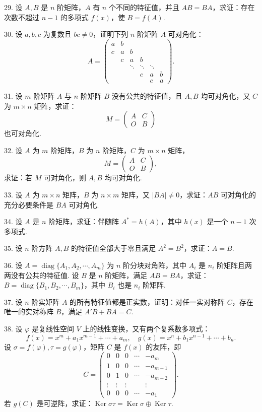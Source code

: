 \documentclass[UTF8, 12pt, fontset=fandol, oneside]{ctexart}
\begin{document}
29. 设 $A,B$ 是 $n$ 阶矩阵，$A$ 有 $n$ 个不同的特征值，并且 $AB=BA$，求证：存在次数不超过 $n-1$ 的多项式 $f(x)$，使 $B=f(A)$.

30. 设 $a,b,c$ 为复数且 $bc\neq 0$，证明下列 $n$ 阶矩阵 $A$ 可对角化：
\[
A=\left(\begin{array}{cccccc}
a & b & & & & \\
c & a & b & & & \\
& c & a & b & & \\
& & \ddots & \ddots & \ddots & \\
& & & c & a & b\\
& & & & c & a
\end{array}\right).
\]

31. 设 $m$ 阶矩阵 $A$ 与 $n$ 阶矩阵 $B$ 没有公共的特征值，且 $A,B$ 均可对角化，又 $C$ 为 $m\times n$ 矩阵，求证：
\[
M=\left(\begin{array}{cc}
A & C\\
O & B
\end{array}\right)
\]
也可对角化.

32. 设 $A$ 为 $m$ 阶矩阵，$B$ 为 $n$ 阶矩阵，$C$ 为 $m\times n$ 矩阵，
\[
M=\left(\begin{array}{cc}
A & C\\
O & B
\end{array}\right),
\]
求证：若 $M$ 可对角化，则 $A,B$ 均可对角化.

33. 设 $A$ 为 $m\times n$ 矩阵，$B$ 为 $n\times m$ 矩阵，又 $|BA|\neq 0$，求证：$AB$ 可对角化的充分必要条件是 $BA$ 可对角化.

34. 设 $A$ 是 $n$ 阶矩阵，求证：伴随阵 $A^*=h(A)$，其中 $h(x)$ 是一个 $n-1$ 次多项式.

35. 设 $n$ 阶方阵 $A,B$ 的特征值全部大于零且满足 $A^2=B^2$，求证：$A=B$.

36. 设 $A=\operatorname{diag}\{A_1,A_2,\cdots,A_m\}$ 为 $n$ 阶分块对角阵，其中 $A_i$ 是 $n_i$ 阶矩阵且两两没有公共的特征值. 设 $B$ 是 $n$ 阶矩阵，满足 $AB=BA$，求证：$B=\operatorname{diag}\{B_1,B_2,\cdots,B_m\}$，其中 $B_i$ 也是 $n_i$ 阶矩阵.

37. 设 $n$ 阶实矩阵 $A$ 的所有特征值都是正实数，证明：对任一实对称阵 $C$，存在唯一的实对称阵 $B$，满足 $A'B+BA=C$.

38. 设 $\varphi$ 是复线性空间 $V$ 上的线性变换，又有两个复系数多项式：
\[
f(x)=x^m+a_1x^{m-1}+\cdots+a_m,\quad g(x)=x^n+b_1x^{n-1}+\cdots+b_n.
\]
设 $\sigma=f(\varphi),\tau=g(\varphi)$，矩阵 $C$ 是 $f(x)$ 的友阵，即
\[
C=\left(\begin{array}{ccccc}
0 & 0 & 0 & \cdots & -a_m\\
1 & 0 & 0 & \cdots & -a_{m-1}\\
0 & 1 & 0 & \cdots & -a_{m-2}\\
\vdots & \vdots & \vdots & & \vdots\\
0 & 0 & 0 & \cdots & -a_1
\end{array}\right).
\]
若 $g(C)$ 是可逆阵，求证：$\operatorname{Ker}\sigma\tau=\operatorname{Ker}\sigma\oplus\operatorname{Ker}\tau$.
\end{document}
